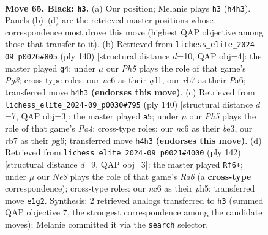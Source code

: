 \documentclass[11pt]{article}
\begin{document}
\clearpage

\begin{figure}[p]\centering
\begin{subfigure}{0.46\textwidth}\centering
\resizebox{\linewidth}{!}{%
\newchessgame
\chessboard[
  setfen={8/1R6/2Np4/8/5k1p/6p1/8/4n1K1 b - - 5 65},
  showmover=false,
  pgfstyle=straightmove, color=movearrow, markmove={h4-h3}
]}
\caption{}
\end{subfigure}\hfill
\begin{subfigure}{0.46\textwidth}\centering
\resizebox{\linewidth}{!}{%
\newchessgame
\chessboard[
  setfen={8/8/P4k2/8/5P2/4K1P1/8/3q4 w - - 2 71},
  showmover=false,
  pgfstyle=straightmove, color=movearrow, markmove={g3-g4}
]}
\caption{}
\end{subfigure}
\\[4pt]
\begin{subfigure}{0.46\textwidth}\centering
\resizebox{\linewidth}{!}{%
\newchessgame
\chessboard[
  setfen={8/1N6/4k1p1/1P6/P1K3P1/4b3/8/8 w - - 3 71},
  showmover=false,
  pgfstyle=straightmove, color=movearrow, markmove={a4-a5}
]}
\caption{}
\end{subfigure}\hfill
\begin{subfigure}{0.46\textwidth}\centering
\resizebox{\linewidth}{!}{%
\newchessgame
\chessboard[
  setfen={8/5k2/R7/6Pp/5K1P/8/8/1r6 w - - 3 72},
  showmover=false,
  pgfstyle=straightmove, color=movearrow, markmove={a6-f6}
]}
\caption{}
\end{subfigure}
\caption{\textbf{Move 65, Black: \texttt{h3}.} (a) Our position; Melanie plays \texttt{h3} (\texttt{h4h3}). Panels (b)--(d) are the retrieved master positions whose correspondence most drove this move (highest QAP objective among those that transfer to it). (b) Retrieved from \texttt{lichess\_elite\_2024-09\_p0026\#805} (ply 140) [structural distance $d$=10, QAP obj=4]: the master played \texttt{g4}; under $\mu$ our \emph{Ph5} plays the role of that game's \emph{Pg3}; cross-type roles: our \emph{n}c6 as their \emph{q}d1, our \emph{r}b7 as their \emph{P}a6; transferred move \texttt{h4h3} \textbf{(endorses this move)}. (c) Retrieved from \texttt{lichess\_elite\_2024-09\_p0030\#795} (ply 140) [structural distance $d$=7, QAP obj=3]: the master played \texttt{a5}; under $\mu$ our \emph{Ph5} plays the role of that game's \emph{Pa4}; cross-type roles: our \emph{n}c6 as their \emph{b}e3, our \emph{r}b7 as their \emph{p}g6; transferred move \texttt{h4h3} \textbf{(endorses this move)}. (d) Retrieved from \texttt{lichess\_elite\_2024-09\_p0021\#4000} (ply 142) [structural distance $d$=9, QAP obj=3]: the master played \texttt{Rf6+}; under $\mu$ our \emph{Ne8} plays the role of that game's \emph{Ra6} (a \textbf{cross-type} correspondence); cross-type roles: our \emph{n}c6 as their \emph{p}h5; transferred move \texttt{e1g2}. Synthesis: 2 retrieved analogs transferred to \texttt{h3} (summed QAP objective 7, the strongest correspondence among the candidate moves); Melanie committed it via the \texttt{search} selector.}
\label{fig:thought-m129}
\end{figure}
\end{document}
